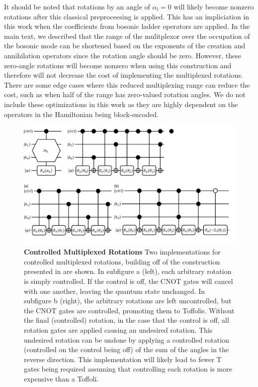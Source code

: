 It should be noted that rotations by an angle of $\alpha_l = 0$ will likely become nonzero rotations after this classical preproceesing is applied.
This has an impliciation in this work when the coefficients from bosonic ladder operators are applied.
In the main text, we described that the range of the mulitplexor over the occupation of the bosonic mode can be shortened based on the exponents of the creation and annihilation operators since the rotation angle should be zero.
However, these zero-angle rotations will become nonzero when using this construction and therefore will not decrease the cost of implementing the multiplexed rotations.
There are some edge cases where this reduced multiplexing range can reduce the cost, such as when half of the range has zero-valued rotation angles.
We do not include these optimizations in this work as they are highly dependent on the operators in the Hamiltonian being block-encoded.

\begin{figure}
    \centering
    \includegraphics[width=16cm]{figures/controlled-multiplexed-rotations.pdf}
    \caption{
        \textbf{Controlled Multiplexed Rotations}
        Two implementations for controlled multiplexed rotations, building off of the construction presented in \cite{mottonen2004transformation} are shown.
        In subfigure a (left), each arbitrary rotation is simply controlled.
        If the control is off, the CNOT gates will cancel with one another, leaving the quantum state unchanged.
        In subfigure b (right), the arbitrary rotations are left uncontrolled, but the CNOT gates are controlled, promoting them to Toffolis.
        Without the final (controlled) rotation, in the case that the control is off, all rotation gates are applied causing an undesired rotation.
        This undesired rotation can be undone by applying a controlled rotation (controlled on the control being off) of the sum of the angles in the reverse direction.
        This implementation will likely lead to fewer T gates being required assuming that controlling each rotation is more expensive than a Toffoli.
    }
    \label{fig:controlled-multiplexed-rotations}
\end{figure}

